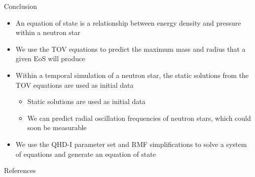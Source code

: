 \documentclass[handout]{beamer}
\begin{document}
    \begin{frame}{Conclusion}
        \begin{itemize}
            \item An equation of state is a relationship between energy density and pressure within a neutron star \pause
            \item We use the TOV equations to predict the maximum mass and radius that a given EoS will produce \pause
            \item Within a temporal simulation of a neutron star, the static solutions from the TOV equations are used as initial data \begin{itemize}
                \item Static solutions are used as initial data
                \item We can predict radial oscillation frequencies of neutron stars, which could soon be measurable
            \end{itemize}
            \item We use the QHD-I parameter set and RMF simplifications to solve a system of equations and generate an equation of state
        \end{itemize}
    \end{frame}

    \begin{frame}[allowframebreaks]{References}
        \nocite{*}
        \printbibliography
    \end{frame}
\end{document}
